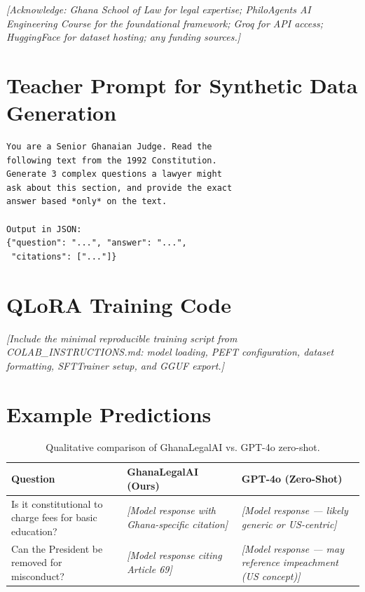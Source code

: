 \documentclass[11pt]{article}
\begin{document}
\textit{[Acknowledge: Ghana School of Law for legal expertise;
PhiloAgents AI Engineering Course for the foundational framework;
Groq for API access; HuggingFace for dataset hosting;
any funding sources.]}





\appendix

\section{Teacher Prompt for Synthetic Data Generation}
\label{sec:appendix-prompt}

\begin{lstlisting}[language={},basicstyle=\ttfamily\small]
You are a Senior Ghanaian Judge. Read the
following text from the 1992 Constitution.
Generate 3 complex questions a lawyer might
ask about this section, and provide the exact
answer based *only* on the text.

Output in JSON:
{"question": "...", "answer": "...",
 "citations": ["..."]}
\end{lstlisting}


\section{QLoRA Training Code}
\label{sec:appendix-training}

\textit{[Include the minimal reproducible training script from
COLAB\_INSTRUCTIONS.md: model loading, PEFT configuration,
dataset formatting, SFTTrainer setup, and GGUF export.]}


\section{Example Predictions}
\label{sec:appendix-examples}

\begin{table}[h]
\centering
\small
\begin{tabular}{p{4cm}p{5.5cm}p{5.5cm}}
\toprule
\textbf{Question} & \textbf{GhanaLegalAI (Ours)} & \textbf{GPT-4o (Zero-Shot)} \\
\midrule
Is it constitutional to charge fees for basic education? &
\textit{[Model response with Ghana-specific citation]} &
\textit{[Model response — likely generic or US-centric]} \\
\midrule
Can the President be removed for misconduct? &
\textit{[Model response citing Article 69]} &
\textit{[Model response — may reference impeachment (US concept)]} \\
\bottomrule
\end{tabular}
\caption{Qualitative comparison of GhanaLegalAI vs. GPT-4o zero-shot.}
\label{tab:examples}
\end{table}
\end{document}
